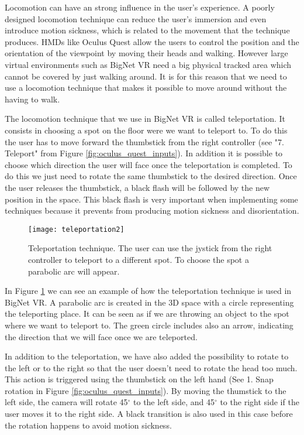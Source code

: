 Locomotion can have an strong influence in the user's experience. A poorly designed locomotion technique can reduce the user's immersion and even introduce motion sickness, which is related to the movement that the technique produces. HMDs like Oculus Quest allow the users to control the position and the orientation of the viewpoint by moving their heads and walking. However large virtual environments such as BigNet VR need a big physical tracked area which cannot be covered by just walking around. It is for this reason that we need to use a locomotion technique that makes it possible to move around without the having to walk\cite{locomotion_technique}.

The locomotion technique that we use in BigNet VR is called teleportation. It consists in choosing a spot on the floor were we want to teleport to. To do this the user has to move forward the thumbstick from the right controller (see "7. Teleport" from Figure \ref{fig:oculus_quest_inputs}). In addition it is possible to choose which direction the user will face once the teleportation is completed. To do this we just need to rotate the same thumbstick to the desired direction. Once the user releases the thumbstick, a black flash will be followed by the new position in the space. This black flash is very important when implementing some techniques because it prevents from producing motion sickness and disorientation.

\begin{figure}[h!]
    \centering%
    \texttt{[image: teleportation2]}
    \caption{Teleportation technique. The user can use the jystick from the right controller to teleport to a different spot. To choose the spot a parabolic arc will appear.}
    \label{fig:teleportation}
\end{figure}%

In Figure \ref{fig:teleportation} we can see an example of how the teleportation technique is used in BigNet VR. A  parabolic arc is created in the 3D space with a circle representing the teleporting place. It can be seen as if we are throwing an object to the spot where we want to teleport to. The green circle includes also an arrow, indicating the direction that we will face once we are teleported.

In addition to the teleportation, we have also added the possibility to rotate to the left or to the right so that the user doesn't need to rotate the head too much. This action is triggered using the thumbstick on the left hand (See 1. Snap rotation in Figure \ref{fig:oculus_quest_inputs}). By moving the thumstick to the left side, the camera will rotate 45$^{\circ}$ to the left side, and 45$^{\circ}$ to the right side if the user moves it to the right side. A black transition is also used in this case before the rotation happens to avoid motion sickness.

